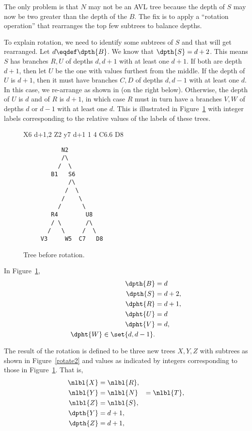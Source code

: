 \begin{definition}
The only problem is that $N$ may not be an AVL tree because the depth
of $S$ may now be two greater than the depth of the $B$.  The fix is
to apply a ``rotation operation'' that rearranges the top few subtrees
to balance depths.

To explain rotation, we need to identify some subtrees of $S$ and that
will get rearranged.  Let $d \eqdef \dpth{B}$.  We know that $\dpth{S}
= d+2$.  This means $S$ has branches $R,U$ of depths $d,d+1$ with at
least one $d+1$.  If both are depth $d+1$, then let $U$ be the one
with values furthest from the middle.  If the depth of $U$ is $d+1$,
then it must have branches $C,D$ of depths $d,d-1$ with at least one
$d$.  In this case, we re-arrange as shown in (on the right below).
Otherwise, the depth of $U$ is $d$ and of $R$ is $d+1$, in which case
$R$ must in turn have a branches $V,W$ of depths $d$ or $d-1$ with at
least one $d$.  This is illustrated in Figure~\ref{rotate1} with
integer labels corresponding to the relative values of the labels of
these trees.

\begin{figure}                                                          X6                  
                                                           d+1,2  Z2             y7  d+1    
                                                                1   4        C6.6  D8       
\begin{verbatim}
           N2                 
           /\
          /  \
        B1   S6
             /\
            /  \
           /    \
          /      \
        R4        U8
        / \       /\
       /   \     /  \
     V3     W5  C7   D8 
\end{verbatim}

\caption{Tree before rotation.}

\label{rotate1}

\end{figure}

In Figure~\ref{rotate1},
\begin{align*}
\dpth{B} & = d\\
\dpth{S} & = d+2,\\
\dpht{R} & = d+1,\\
\dpht{U} & = d\\
\dpht{V} & = d,\\
\dpht{W} \in  \set{d, d-1}.\\
\end{align*}

The result of the rotation is defined to be three new trees $X,Y,Z$
with subtrees as shown in Figure~\ref{rotate2} and values as indicated
by integers corresponding to those in Figure~\ref{rotate1}.  That is,
\begin{align*}
\nlbl{X}  & = \nlbl{R},\\
\nlbl{Y}  & = \nlbl{N}  & = \nlbl{T},\\
\nlbl{Z}  &= \nlbl{S},\\
\dpth{Y} & = d+1,\\
\dpth{Z} & = d+1,
\end{align*}


\end{definition}
